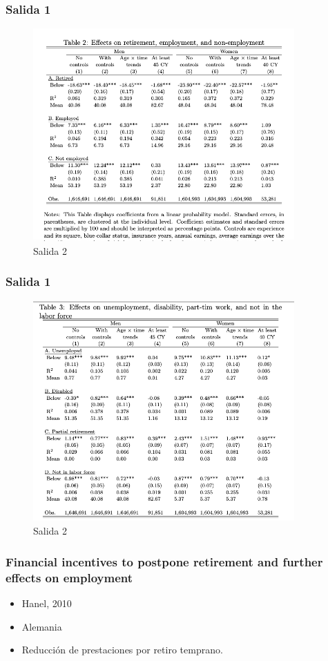 \documentclass{beamer}
\begin{document}
  \frame
  {
    \frametitle{Salida 1}
      \begin{figure}[htp]
        \centering
        \includegraphics[width=10cm]{imgs/staubli-tab2}
        \caption{Salida 2}
        \label{fig:fig2}
      \end{figure}
  }
  \frame
  {
    \frametitle{Salida 1}
      \begin{figure}[htp]
        \centering
        \includegraphics[width=10cm]{imgs/staubli-tab3}
        \caption{Salida 2}
        \label{fig:fig2}
      \end{figure}
  }
  \frame
  {
    \frametitle{Financial incentives to postpone retirement and further effects on employment}
    \begin{itemize}
    \item Hanel, 2010
    \item Alemania
    \item Reducción de prestaciones por retiro temprano.
    \end{itemize}
  }
\end{document}
